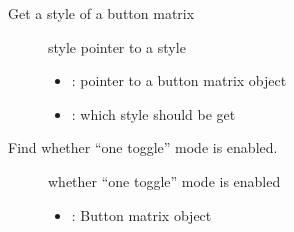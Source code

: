 \documentclass[letterpaper,10pt,english]{sphinxmanual}
\begin{document}
\begin{fulllineitems}
\label{\detokenize{object-types/btnm:_CPPv417lv_btnm_get_stylePK8lv_obj_t15lv_btnm_style_t}}%
\pysigstartmultiline
{}\label{\detokenize{object-types/btnm:lv__btnm_8h_1a16446edadc6e4480269fdf651297571e}}%
\pysigstopmultiline
Get a style of a button matrix \begin{description}
\item[{}] \leavevmode
style pointer to a style 

\item[{}] \leavevmode\begin{itemize}
\item {} 
: pointer to a button matrix object 

\item {} 
: which style should be get 

\end{itemize}

\end{description}


\end{fulllineitems}


\begin{fulllineitems}
\label{\detokenize{object-types/btnm:_CPPv422lv_btnm_get_one_togglePK8lv_obj_t}}%
\pysigstartmultiline
{}\label{\detokenize{object-types/btnm:lv__btnm_8h_1a2f0ff3e680b705ff757345bf15bea6bb}}%
\pysigstopmultiline
Find whether “one toggle” mode is enabled. \begin{description}
\item[{}] \leavevmode
whether “one toggle” mode is enabled 

\item[{}] \leavevmode\begin{itemize}
\item {} 
: Button matrix object 

\end{itemize}

\end{description}


\end{fulllineitems}
\end{document}
